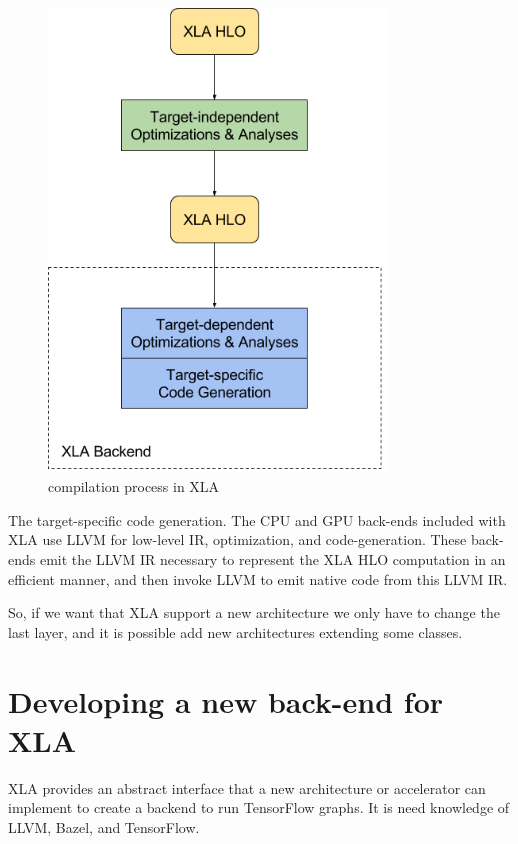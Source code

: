 \documentclass[11pt,openany]{book}
\begin{document}
\begin{figure}[h]
    \centering
    \includegraphics[width=0.8\textwidth]{img/how-does-xla-work.png}
    \caption{compilation process in XLA}
    \label{fig:const_add}
\end{figure}

The target-specific code generation. The CPU and GPU back-ends included with XLA use LLVM for low-level IR, optimization, and code-generation. These back-ends emit the LLVM IR necessary to represent the XLA HLO computation in an efficient manner, and then invoke LLVM to emit native code from this LLVM IR.

So, if we want that XLA support a new architecture we only have to change the last layer, and it is possible add new architectures extending some classes.

\section{Developing a new back-end for XLA}

XLA provides an abstract interface that a new architecture or accelerator can implement to create a backend to run TensorFlow graphs. It is need knowledge of LLVM, Bazel, and TensorFlow.
\end{document}
